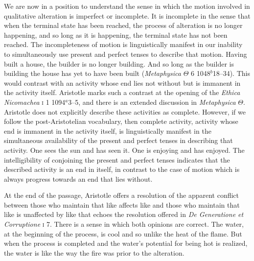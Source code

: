 We are now in a position to understand the sense in which the motion involved in qualitative alteration is imperfect or incomplete. It is incomplete in the sense that when the terminal state has been reached, the process of alteration is no longer happening, and so long as it is happening, the terminal state has not been reached. The incompleteness of motion is linguistically manifest in our inability to simultaneously use present and perfect tenses to describe that motion. Having built a house, the builder is no longer building. And so long as the builder is building the house has yet to have been built (\emph{Metaphysica} \( \Theta \) 6 1048\( ^{b} \)18--34). This would contrast with an activity whose end lies not without but is immanent in the activity itself. Aristotle marks such a contrast at the opening of the \emph{Ethica Nicomachea} \textsc{i} 1 1094\( ^{a} \)3--5, and there is an extended discussion in \emph{Metaphysica} \( \Theta \). Aristotle does not explicitly describe these activities as complete. However, if we follow the post-Aristotelian vocabulary, then complete activity, activity whose end is immanent in the activity itself, is linguistically manifest in the simultaneous availability of the present and perfect tenses in describing that activity. One sees the sun and has seen it. One is enjoying and has enjoyed. The intelligibility of conjoining the present and perfect tenses indicates that the described activity is an end in itself, in contrast to the case of motion which is always progress towards an end that lies without.

At the end of the passage, Aristotle offers a resolution of the apparent conflict between those who maintain that like affects like and those who maintain that like is unaffected by like that echoes the resolution offered in \emph{De Generatione et Corruptione} \textsc{i} 7. There is a sense in which both opinions are correct. The water, at the beginning of the process, is cool and so unlike the heat of the flame. But when the process is completed and the water's potential for being hot is realized, the water is like the way the fire was prior to the alteration. 

